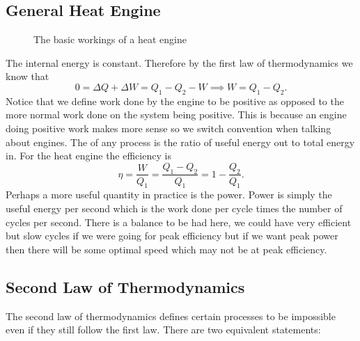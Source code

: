 \documentclass[a4paper]{article}
\begin{document}
    \subsection{General Heat Engine}
    \begin{figure}
        \centering
        \caption{The basic workings of a heat engine}
        \label{fig:heat engine}
    \end{figure}
    The internal energy is constant.
    Therefore by the first law of thermodynamics we know that
    \[0 = \Delta Q + \Delta W = Q_1 - Q_2 - W \implies W = Q_1 - Q_2.\]
    Notice that we define work done by the engine to be positive as opposed to the more normal work done on the system being positive.
    This is because an engine doing positive work makes more sense so we switch convention when talking about engines.
    The  of any process is the ratio of useful energy out to total energy in.
    For the heat engine the efficiency is
    \[\eta = \frac{W}{Q_1} = \frac{Q_1 - Q_2}{Q_1} = 1 - \frac{Q_2}{Q_1}.\]
    Perhaps a more useful quantity in practice is the power.
    Power is simply the useful energy per second which is the work done per cycle times the number of cycles per second.
    There is a balance to be had here, we could have very efficient but slow cycles if we were going for peak efficiency but if we want peak power then there will be some optimal speed which may not be at peak efficiency.
    
    \subsection{Second Law of Thermodynamics}
    The second law of thermodynamics defines certain processes to be impossible even if they still follow the first law.
    There are two equivalent statements:
    
\end{document}
